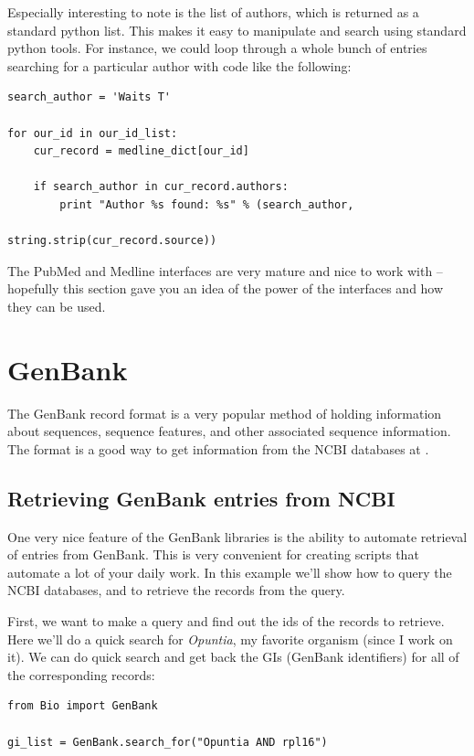 \documentclass{report}
\begin{document}
Especially interesting to note is the list of authors, which is returned as a standard python list. This makes it easy to manipulate and search using standard python tools. For instance, we could loop through a whole bunch of entries searching for a particular author with code like the following:

\begin{verbatim}
search_author = 'Waits T'

for our_id in our_id_list:
    cur_record = medline_dict[our_id]
    
    if search_author in cur_record.authors:
        print "Author %s found: %s" % (search_author,
                                       string.strip(cur_record.source))
\end{verbatim} 

The PubMed and Medline interfaces are very mature and nice to work with -- hopefully this section gave you an idea of the power of the interfaces and how they can be used.

\section{GenBank}

The GenBank record format is a very popular method of holding information about sequences, sequence features, and other associated sequence information. The format is a good way to get information from the NCBI databases at . 

\subsection{Retrieving GenBank entries from NCBI}

One very nice feature of the GenBank libraries is the ability to automate retrieval of entries from GenBank. This is very convenient for creating scripts that automate a lot of your daily work. In this example we'll show how to query the NCBI databases, and to retrieve the records from the query.


First, we want to make a query and find out the ids of the records to retrieve. Here we'll do a quick search for \emph{Opuntia}, my favorite organism (since I work on it). We can do quick search and get back the GIs (GenBank identifiers) for all of the corresponding records:

\begin{verbatim}
from Bio import GenBank

gi_list = GenBank.search_for("Opuntia AND rpl16")
\end{verbatim}
\end{document}
